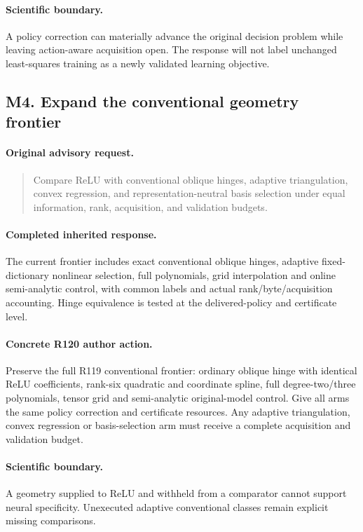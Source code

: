 \paragraph{Scientific boundary.}
A policy correction can materially advance the original decision problem while leaving action-aware acquisition open. The response will not label unchanged least-squares training as a newly validated learning objective.

\subsection{M4. Expand the conventional geometry frontier}
\label{response120:M4}
\paragraph{Original advisory request.}
\begin{quote}
Compare ReLU with conventional oblique hinges, adaptive triangulation, convex regression, and representation-neutral basis selection under equal information, rank, acquisition, and validation budgets.
\end{quote}
\paragraph{Completed inherited response.}
The current frontier includes exact conventional oblique hinges, adaptive fixed-dictionary nonlinear selection, full polynomials, grid interpolation and online semi-analytic control, with common labels and actual rank/byte/acquisition accounting. Hinge equivalence is tested at the delivered-policy and certificate level.
\paragraph{Concrete R120 author action.}
Preserve the full R119 conventional frontier: ordinary oblique hinge with identical ReLU coefficients, rank-six quadratic and coordinate spline, full degree-two/three polynomials, tensor grid and semi-analytic original-model control. Give all arms the same policy correction and certificate resources. Any adaptive triangulation, convex regression or basis-selection arm must receive a complete acquisition and validation budget.
\paragraph{Scientific boundary.}
A geometry supplied to ReLU and withheld from a comparator cannot support neural specificity. Unexecuted adaptive conventional classes remain explicit missing comparisons.

